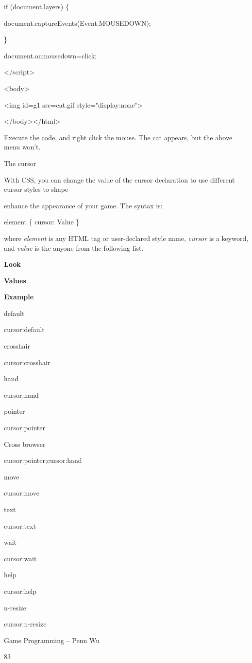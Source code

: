 \documentclass[
]{article}
\begin{document}
if (document.layers) \{

document.captureEvents(Event.MOUSEDOWN);

\}

document.onmousedown=click;

\textless/script\textgreater{}

\textless body\textgreater{}

\textless img id=g1 src=cat.gif style="display:none"\textgreater{}

\textless/body\textgreater\textless/html\textgreater{}

Execute the code, and right click the mouse. The cat appears, but the
above menu won't.

The cursor

With CSS, you can change the value of the cursor declaration to use
different cursor styles to shape

enhance the appearance of your game. The syntax is:

element \{ cursor: Value \}

where \emph{element} is any HTML tag or user-declared style name,
\emph{cursor} is a keyword, and \emph{value} is the anyone from the
following list.

\textbf{Look}

\textbf{Values}

\textbf{Example}

default

cursor:default

crosshair

cursor:crosshair

hand

cursor:hand

pointer

cursor:pointer

Cross browser

cursor:pointer;cursor:hand

move

cursor:move

text

cursor:text

wait

cursor:wait

help

cursor:help

n-resize

cursor:n-resize

Game Programming -- Penn Wu

83
\end{document}
